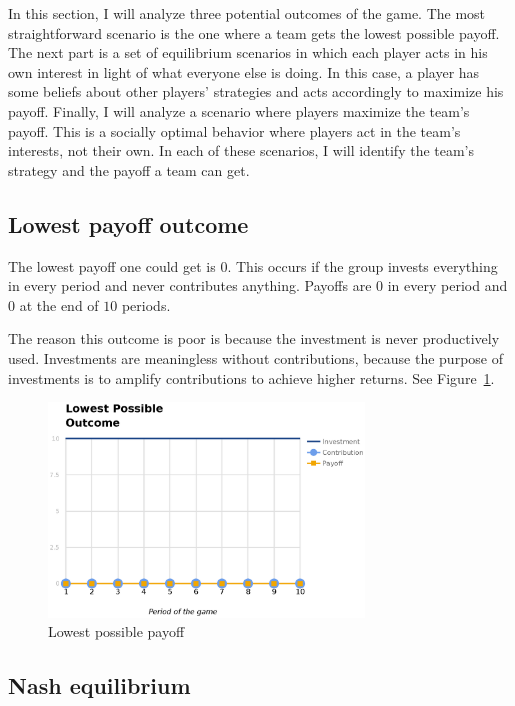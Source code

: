 	In this section, I will analyze three potential outcomes of the game. The most straightforward scenario is the one where a team gets the lowest possible payoff. The next part is a set of equilibrium scenarios in which each player acts in his own interest in light of what everyone else is doing. In this case, a player has some beliefs about other players' strategies and acts accordingly to maximize his payoff. Finally, I will analyze a scenario where players maximize the team's payoff. This is a socially optimal behavior where players act in the team's interests, not their own. In each of these scenarios, I will identify the team's strategy and the payoff a team can get.

		
	\subsection{Lowest payoff outcome}
	
		The lowest payoff one could get is $0$. This occurs if the group invests everything in every period and never contributes anything. Payoffs are $0$ in every period and $0$ at the end of $10$ periods.
	
		The reason this outcome is poor is because the investment is never productively used. Investments are meaningless without contributions, because the purpose of investments is to amplify contributions to achieve higher returns. See Figure~\ref{fig:lowest}.

		\begin{figure}
			\begin{center}
				\includegraphics[width=8.4cm]{resources/eps/lowest.eps}
				\caption{Lowest possible payoff} 
				\label{fig:lowest}
			\end{center}
		\end{figure}
		
	\subsection{Nash equilibrium}

